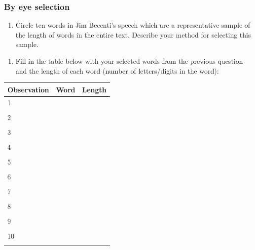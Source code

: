 \documentclass[
]{report}
\providecommand{\tightlist}{%
  \setlength{\itemsep}{0pt}\setlength{\parskip}{0pt}}
\begin{document}
\hypertarget{by-eye-selection}{%
\subsubsection*{By eye selection}\label{by-eye-selection}}

\begin{enumerate}
\def\labelenumi{\arabic{enumi}.}
\tightlist
\item
  Circle ten words in Jim Becenti's speech which are a representative sample of the length of words in the entire text. Describe your method for selecting this sample.
\end{enumerate}

\vspace{0.3in}

\begin{enumerate}
\def\labelenumi{\arabic{enumi}.}
\setcounter{enumi}{1}
\tightlist
\item
  Fill in the table below with your selected words from the previous question and the length of each word (number of letters/digits in the word):
  \vspace{1mm}
\end{enumerate}

\begin{center}
\begin{tabular}{|l|p{3in}|p{1in}|} \hline
Observation & Word & Length  \\ \hline
1 & & \\ 
& & \\ \hline
2 & & \\ 
& & \\ \hline
3 & & \\ 
& & \\ \hline
4 & & \\ 
& & \\ \hline
5 & & \\ 
& & \\ \hline
6 & & \\ 
& & \\ \hline
7 & & \\
& & \\ \hline
8 & & \\ 
& & \\ \hline
9 & & \\ 
& & \\ \hline
10 & & \\ 
& & \\ \hline
\end{tabular}
\end{center}
\end{document}
